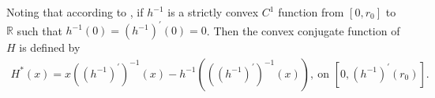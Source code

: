 \documentclass[11pt,reqno]{amsart}
\theoremstyle{plain}
\numberwithin{equation}{section}
\numberwithin{equation}{section}
\begin{document}
Noting that according to \cite{alabau1}, if $h^{-1}$ is a strictly convex $%
C^{1}$ function from $\left[ 0,r_{0}\right] $ to $%
\mathbb{R}
$ such that $h^{-1}\left( 0\right) =\left( h^{-1}\right) ^{\prime }\left(
0\right) =0$. Then the convex conjugate function of $H$ is defined by 
\begin{equation}
\begin{array}{c}
H^{\ast }\left( x\right) =x\left( \left( h^{-1}\right) ^{\prime }\right)
^{-1}\left( x\right) -h^{-1}\left( \left( \left( h^{-1}\right) ^{\prime
}\right) ^{-1}\left( x\right) \right) ,~\text{on }\left[ 0,\left(
h^{-1}\right) ^{\prime }\left( r_{0}\right) \right] .%
\end{array}
\label{convex conjugate}
\end{equation}
\end{document}
